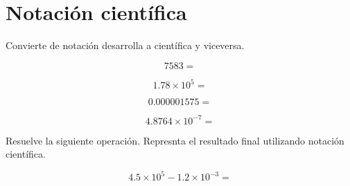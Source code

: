 \documentclass[11pt]{article}
\begin{document}
\newpage
\section{Notaci\'on cient\'ifica} %
 \label{sec:notaci'on_cient'ifica}
 

Convierte de notaci\'on desarrolla a cient\'ifica y viceversa.

\begin{equation}
7583 = 
\end{equation}

\vspace{1cm}
\begin{equation}
1.78 \times 10^{5}=
\end{equation}

\vspace{1cm}
\begin{equation}
0.000001575=
\end{equation}

\vspace{1cm}
\begin{equation}
4.8764 \times 10^{-7} =
\end{equation}

\vspace{2cm}
Resuelve la siguiente operaci\'on. Represnta el resultado final utilizando
notaci\'on cient\'ifica.

\begin{equation}
4.5 \times 10 ^{5} - 1.2 \times 10^{-3} =
\end{equation}
\end{document}
